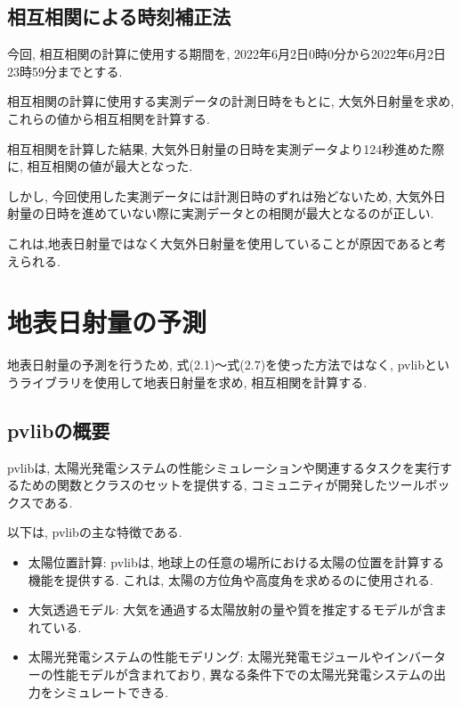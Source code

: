 
\subsection{相互相関による時刻補正法}
今回, 相互相関の計算に使用する期間を, 2022年6月2日0時0分から2022年6月2日23時59分までとする.


相互相関の計算に使用する実測データの計測日時をもとに, 大気外日射量を求め, これらの値から相互相関を計算する.

相互相関を計算した結果, 大気外日射量の日時を実測データより124秒進めた際に, 相互相関の値が最大となった.

しかし, 今回使用した実測データには計測日時のずれは殆どないため, 大気外日射量の日時を進めていない際に実測データとの相関が最大となるのが正しい.

これは,地表日射量ではなく大気外日射量を使用していることが原因であると考えられる.

\section{地表日射量の予測}

地表日射量の予測を行うため, 式(2.1)～式(2.7)を使った方法ではなく, pvlibというライブラリを使用して地表日射量を求め, 相互相関を計算する.

\subsection{pvlibの概要}
pvlibは, 太陽光発電システムの性能シミュレーションや関連するタスクを実行するための関数とクラスのセットを提供する, コミュニティが開発したツールボックスである. 

以下は, pvlibの主な特徴である.

\begin{itemize}
  \item 太陽位置計算: pvlibは, 地球上の任意の場所における太陽の位置を計算する機能を提供する. これは, 太陽の方位角や高度角を求めるのに使用される.
  \item 大気透過モデル: 大気を通過する太陽放射の量や質を推定するモデルが含まれている.
  \item 太陽光発電システムの性能モデリング: 太陽光発電モジュールやインバーターの性能モデルが含まれており, 異なる条件下での太陽光発電システムの出力をシミュレートできる.
\end{itemize}


